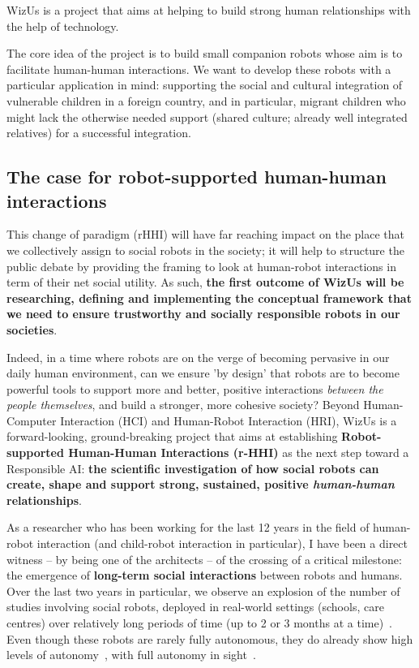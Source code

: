 \documentclass[11pt,a4paper]{report}
\newcommand{\project}{WizUs\xspace}
\begin{document}
\project is a project that aims at helping to build strong human
relationships with the help of technology.

The core idea of the project is to build small companion robots whose
aim is to facilitate human-human interactions. We want to develop these
robots with a particular application in mind: supporting the social and
cultural integration of vulnerable children in a foreign country, and in
particular, migrant children who might lack the otherwise needed support
(shared culture; already well integrated relatives) for a successful
integration.

\subsection{The case for robot-supported human-human interactions}

This change of paradigm (rHHI) will have far reaching impact on the place that
we collectively assign to social robots in the society; it will help to
structure the public debate by providing the framing to look at human-robot
interactions in term of their net social utility.  As such, \textbf{the first
outcome of \project will be researching, defining and implementing the
conceptual framework that we need to ensure trustworthy and socially responsible
robots in our societies}.

Indeed, in a time where robots are on the verge of becoming pervasive in our
daily human environment, can we ensure 'by design' that robots are to become
powerful tools to support more and better, positive interactions \emph{between
the people themselves}, and build a stronger, more cohesive society? Beyond
Human-Computer Interaction (HCI) and Human-Robot Interaction (HRI), \project is
a forward-looking, ground-breaking project that aims at establishing
\textbf{Robot-supported Human-Human Interactions (r-HHI)} as the next step
toward a Responsible AI: \textbf{the scientific investigation of how social
robots can create, shape and support strong, sustained, positive
\emph{human-human} relationships}.

As a researcher who has been working for the last 12 years in the field of
human-robot interaction (and child-robot interaction in particular), I have been
a direct witness -- by being one of the architects -- of the crossing of a
critical milestone: the emergence of \textbf{long-term social interactions}
between robots and humans. Over the last two years in particular, we observe an
explosion of the number of studies involving social robots, deployed in
real-world settings (schools, care centres) over relatively long periods of time
(up to 2 or 3 months at a time)~\cite{kunze2018artificial,leite2013social}. Even
though these robots are rarely fully autonomous, they do already show high
levels of autonomy~\cite{senft2019teaching}, with full autonomy in
sight~\cite{hawes2017strands}.
\end{document}

